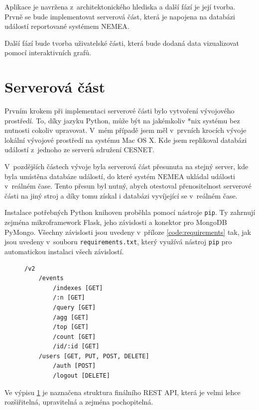 Aplikace je navržena z~architektonického hlediska a další fází je její tvorba. Prvně se bude implementovat serverová část, která je napojena na databázi událostí reportované systémem NEMEA.

Další fází bude tvorba uživatelské části, která bude dodaná data vizualizovat pomocí interaktivních grafů.

\label{implementace}
\section{Serverová část}

Prvním krokem při implementaci serverové části bylo vytvoření vývojového prostředí. To, díky jazyku Python, může být na jakémkoliv *nix systému bez nutnosti cokoliv upravovat. V~mém případě jsem měl v~prvních krocích vývoje lokální vývojové prostředí na systému Mac OS X. Kde jsem replikoval databázi událostí z~jednoho ze serverů sdružení CESNET.

V~pozdějších částech vývoje byla serverová část přesunuta na stejný server, kde byla umístěna databáze událostí, do které systém NEMEA ukládal události v~reálném čase. Tento přesun byl nutný, abych otestoval přenositelnost serverové části na jiný stroj a díky tomu získal i databázi vyvíjející se v~reálném čase.

Instalace potřebných Python knihoven proběhla pomocí nástroje \texttt{pip}. Ty zahrnují zejména mikroframework Flask, jeho závislosti a konektor pro MongoDB PyMongo. Všechny závislosti jsou uvedeny v~příloze \ref{code:requirements} tak, jak jsou uvedeny v~souboru \texttt{requirements.txt}, který využívá nástroj \texttt{pip} pro automatickou instalaci všech závislostí.

\begin{figure}[ht]
\lstset{basicstyle=\small,style=JSON}
\begin{lstlisting}
/v2
    /events
        /indexes [GET]
        /:n [GET]
        /query [GET]
        /agg [GET]
        /top [GET]
        /count [GET]
        /id/:id [GET]
    /users [GET, PUT, POST, DELETE]
        /auth [POST]
        /logout [DELETE]
\end{lstlisting}
\label{code:api}
\end{figure}

Ve výpisu \ref{code:api} je naznačena struktura finálního REST API, která je velmi lehce rozšiřitelná, upravitelná a zejména pochopitelná.

